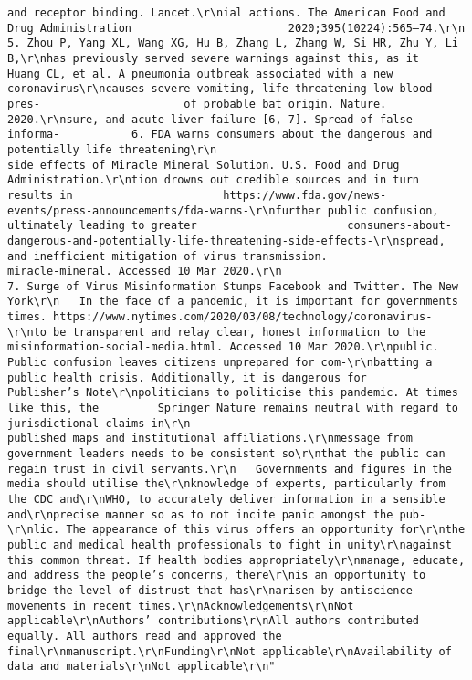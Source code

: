 \documentclass[
]{book}
\begin{document}
\begin{verbatim}
and receptor binding. Lancet.\r\nial actions. The American Food and Drug Administration                        2020;395(10224):565–74.\r\n                                                                         5. Zhou P, Yang XL, Wang XG, Hu B, Zhang L, Zhang W, Si HR, Zhu Y, Li B,\r\nhas previously served severe warnings against this, as it                     Huang CL, et al. A pneumonia outbreak associated with a new coronavirus\r\ncauses severe vomiting, life-threatening low blood pres-                      of probable bat origin. Nature. 2020.\r\nsure, and acute liver failure [6, 7]. Spread of false informa-           6. FDA warns consumers about the dangerous and potentially life threatening\r\n                                                                              side effects of Miracle Mineral Solution. U.S. Food and Drug Administration.\r\ntion drowns out credible sources and in turn results in                       https://www.fda.gov/news-events/press-announcements/fda-warns-\r\nfurther public confusion, ultimately leading to greater                       consumers-about-dangerous-and-potentially-life-threatening-side-effects-\r\nspread, and inefficient mitigation of virus transmission.                     miracle-mineral. Accessed 10 Mar 2020.\r\n                                                                         7. Surge of Virus Misinformation Stumps Facebook and Twitter. The New York\r\n   In the face of a pandemic, it is important for governments                 times. https://www.nytimes.com/2020/03/08/technology/coronavirus-\r\nto be transparent and relay clear, honest information to the                  misinformation-social-media.html. Accessed 10 Mar 2020.\r\npublic. Public confusion leaves citizens unprepared for com-\r\nbatting a public health crisis. Additionally, it is dangerous for        Publisher’s Note\r\npoliticians to politicise this pandemic. At times like this, the         Springer Nature remains neutral with regard to jurisdictional claims in\r\n                                                                         published maps and institutional affiliations.\r\nmessage from government leaders needs to be consistent so\r\nthat the public can regain trust in civil servants.\r\n   Governments and figures in the media should utilise the\r\nknowledge of experts, particularly from the CDC and\r\nWHO, to accurately deliver information in a sensible and\r\nprecise manner so as to not incite panic amongst the pub-\r\nlic. The appearance of this virus offers an opportunity for\r\nthe public and medical health professionals to fight in unity\r\nagainst this common threat. If health bodies appropriately\r\nmanage, educate, and address the people’s concerns, there\r\nis an opportunity to bridge the level of distrust that has\r\narisen by antiscience movements in recent times.\r\nAcknowledgements\r\nNot applicable\r\nAuthors’ contributions\r\nAll authors contributed equally. All authors read and approved the final\r\nmanuscript.\r\nFunding\r\nNot applicable\r\nAvailability of data and materials\r\nNot applicable\r\n"
\end{verbatim}
\end{document}
